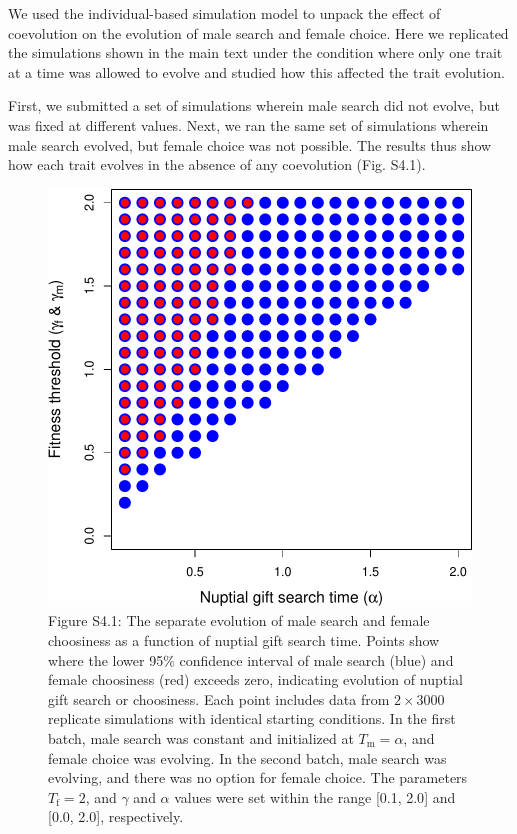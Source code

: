 \documentclass[
]{article}
\begin{document}
We used the individual-based simulation model to unpack the effect of
coevolution on the evolution of male search and female choice. Here we
replicated the simulations shown in the main text under the condition
where only one trait at a time was allowed to evolve and studied how
this affected the trait evolution.

First, we submitted a set of simulations wherein male search did not
evolve, but was fixed at different values. Next, we ran the same set of
simulations wherein male search evolved, but female choice was not
possible. The results thus show how each trait evolves in the absence of
any coevolution (Fig. S4.1).

\captionsetup{labelformat=empty}

\begin{figure}
\centering
\includegraphics{SI_files/figure-latex/unnamed-chunk-9-1.pdf}
\caption{Figure S4.1: The separate evolution of male search and female
choosiness as a function of nuptial gift search time. Points show where
the lower 95\% confidence interval of male search (blue) and female
choosiness (red) exceeds zero, indicating evolution of nuptial gift
search or choosiness. Each point includes data from \(2 \times 3000\)
replicate simulations with identical starting conditions. In the first
batch, male search was constant and initialized at
\(T_{\mathrm{m}} = \alpha\), and female choice was evolving. In the
second batch, male search was evolving, and there was no option for
female choice. The parameters \(T_{\mathrm{f}}=2\), and \(\gamma\) and
\(\alpha\) values were set within the range {[}0.1, 2.0{]} and {[}0.0,
2.0{]}, respectively.}
\end{figure}
\end{document}
